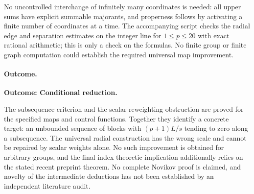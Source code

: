 \documentclass[11pt,a4paper]{article}
\numberwithin{equation}{section}
\begin{document}
No uncontrolled interchange of infinitely many coordinates is needed: all upper sums have explicit summable majorants, and properness follows by activating a finite number of coordinates at a time. The accompanying script checks the radial edge and separation estimates on the integer line for $1\leq p\leq20$ with exact rational arithmetic; this is only a check on the formulas. No finite group or finite graph computation could establish the required universal map improvement.

\paragraph{Outcome.}
\textbf{Outcome: Conditional reduction.}

The subsequence criterion and the scalar-reweighting obstruction are proved for the specified maps and control functions. Together they identify a concrete target: an unbounded sequence of blocks with $(p+1)L/s$ tending to zero along a subsequence. The universal radial construction has the wrong scale and cannot be repaired by scalar weights alone. No such improvement is obtained for arbitrary groups, and the final index-theoretic implication additionally relies on the stated recent preprint theorem. No complete Novikov proof is claimed, and novelty of the intermediate deductions has not been established by an independent literature audit.
\end{document}
